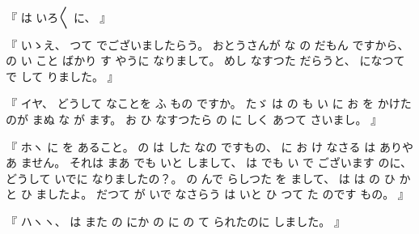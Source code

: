 
%
『
は
いろ〳〵
に、
』

%
『
いゝえ、
%
つて
でございましたらう。
%
おとうさんが
な
の
だもん
ですから、
%
の
い
こと
ばかり
す
やうに
なりまして。
%
めし
なすつた
だらうと、
%
になつて
で
して
りました。
』

%
『
イヤ、
%
どうして
なことを
ふ
もの
ですか。
%
たゞ
は
の
%
も
い
に
お
を
かけたのが
まぬ
な
が
ます。
%
お
ひ
なすつたら
の
に
しく
あつて
さいまし。
』

%
『
ホヽ
に
を
あること。
%
の
は
した
なの
%
ですもの、
%
に
お
け
なさる
は
ありやあ
ません。
%
それは
まあ
でも
いと
しまして、
%
は
でも
い
で
ございます
のに、
%
どうして
いでに
なりましたの？。
%
の
んで
%
らしつた
を
まして、
%
は
は
の
ひ
かと
ひ
ましたよ。
%
だつて
が
いで
なさらう
は
いと
ひ
つて
%
た
のです
もの。
』

%
『
ハヽヽ、
%
は
また
の
にか
の
に
の
て
られたのに
しました。
』


